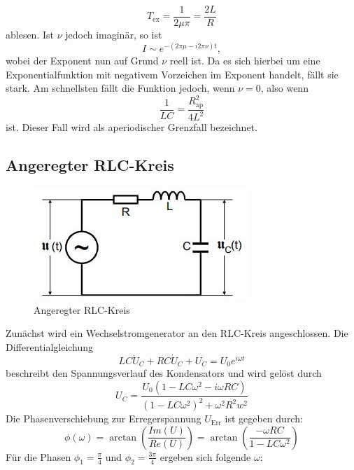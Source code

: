 \begin{equation}
  T_\text{ex}=\frac{1}{2\mu \pi} =\frac{2L}{R}
  \label{eqn:tex}
\end{equation}
ablesen. Ist $\nu$ jedoch imaginär, so ist
\begin{equation}
  I \sim e^{-(2\pi \mu - i2\pi \nu)t},
\end{equation}
wobei der Exponent nun auf Grund $\nu$ reell ist.
Da es sich hierbei um eine Exponentialfunktion mit negativem
Vorzeichen im Exponent handelt, fällt sie stark.
Am schnellsten fällt die Funktion jedoch, wenn $\nu=0$, also wenn
\begin{equation}
\frac{1}{LC}=\frac{R^2_\text{ap}}{4L^2}
\label{eqn:ap}
\end{equation}
ist.
Dieser Fall wird als aperiodischer Grenzfall bezeichnet.
\subsection{Angeregter RLC-Kreis}
\begin{figure}
  \centering
  \includegraphics{Text/Angeregter_RLC-Kreis.JPG}
  \caption{Angeregter RLC-Kreis \cite[289]{sample}}
  \label{fig:Aufbau2}
\end{figure}
Zunächst wird ein Wechselstromgenerator an den RLC-Kreis angeschlossen. Die Differentialgleichung
\begin{equation}
  LC\ddot{U}_C+RC\dot{U}_C+U_C=U_0e^{i\omega t}
\end{equation}
beschreibt den Spannungsverlauf des Kondensators und wird gelöst durch
\begin{equation}
  U_C=\frac{U_0(1-LC\omega^2-i\omega RC)}{(1-LC\omega^2)^2+\omega^2R^2w^2}
\end{equation}
Die Phasenverschiebung zur Erregerspannung $U_\text{Err}$ ist gegeben durch:
\begin{equation}
  \phi(\omega)=\arctan{\left(\frac{Im(U)}{Re(U)}\right)}=\arctan{\left(\frac{-\omega RC}{1-LC\omega^2}\right)}
\end{equation}
Für die Phasen $\phi_1=\frac{\pi}{4}$ und $\phi_2=\frac{3\pi}{4}$ ergeben sich folgende $\omega$:
